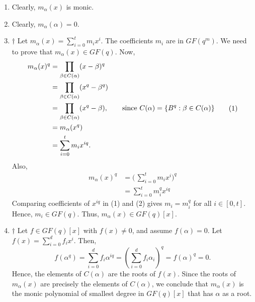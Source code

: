 \begin{Proof}{}{}
    \begin{enumerate}[label=(\roman*)]
        \item Clearly, $ m_\alpha(x) $ is monic.
        \item Clearly, $ m_\alpha(\alpha)=0 $.
        \item $ \dagger $ Let $ m_\alpha(x)=\sum\limits_{i=0}^{t} m_i x^i $.
              The coefficients $ m_i $ are in $ GF(q^m) $. We need to prove that
              $ m_\alpha(x)\in GF(q) $. Now,
              \begin{equation}
                  \begin{aligned}
                      m_\alpha(x)^q
                       & =\prod_{\beta\in C(\alpha)}(x-\beta)^q                                                            \\
                       & =\prod_{\beta\in C(\alpha)}(x^q-\beta^q)                                                          \\
                       & =\prod_{\beta\in C(\alpha)}(x^q-\beta),\qquad \text{since }C(\alpha)=\{B^q:\beta\in C(\alpha)\} \\
                       & =m_\alpha(x^q)                                                                                    \\
                       & =\sum\limits_{i=0}^{t} m_i x^{iq}.
                  \end{aligned}\tag{1}
              \end{equation}
              Also,
              \begin{equation}
                  \begin{aligned}
                      m_\alpha(x)^q
                       & =\biggl(\, \sum\limits_{i=0}^{t} m_i x^i \biggr)^q \\
                       & = \sum\limits_{i=0}^{t} m_i^q x^{iq}
                  \end{aligned}\tag{2}
              \end{equation}
              Comparing coefficients of $ x^{iq} $ in (1) and (2) gives $ m_i=m_i^q $
              for all $ i\in[0,t] $. Hence, $ m_i\in GF(q) $. Thus, $ m_\alpha(x)\in GF(q)[x] $.
        \item $ \dagger $ Let $ f\in GF(q)[x] $ with $ f(x)\neq 0 $, and assume $ f(\alpha)=0 $.
              Let $ f(x)=\sum\limits_{i=0}^{d} f_i x^i $. Then,
              \[ f(\alpha^q)=\sum\limits_{i=0}^{d} f_i\alpha^{iq}=
                  \left( \sum\limits_{i=0}^{d} f_i\alpha_i \right)^q=f(\alpha)^q=0. \]
              Hence, the elements of $ C(\alpha) $ are the roots of $ f(x) $. Since the roots
              of $ m_\alpha(x) $ are precisely the elements of $ C(\alpha) $, we conclude
              that $ m_\alpha(x) $ is the monic polynomial of smallest degree in $ GF(q)[x] $
              that has $ \alpha $ as a root.
    \end{enumerate}
\end{Proof}

